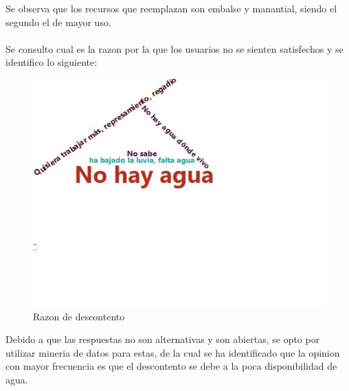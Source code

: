 \documentclass[12pt]{article}\usepackage[]{graphicx}\usepackage[]{xcolor}
\makeatletter
\def\maxwidth{ %
  \ifdim\Gin@nat@width>\linewidth
    \linewidth
  \else
    \Gin@nat@width
  \fi
}
\newenvironment{knitrout}{}{} %
\makeatother
\begin{document}
	Se observa que los recursos que reemplazan son embalse y manantial, siendo el segundo el de mayor uso.\\
	\\
	Se consulto cual es la razon por la que los usuarios no se sienten satisfechos y se identifico lo siguiente:
	\begin{figure}[H]
	\centering
\begin{knitrout}
\color{fgcolor}
\includegraphics[width=\maxwidth]{figure/dieciocho-1} 
\end{knitrout}
	\caption{Razon de descontento}
	\end{figure}
	Debido a que las respuestas no son alternativas y son abiertas, se opto por utilizar mineria de datos para estas, de la cual se ha identificado que la opinion con mayor frecuencia es que el descontento se debe a la poca disponibilidad de agua.
\end{document}
